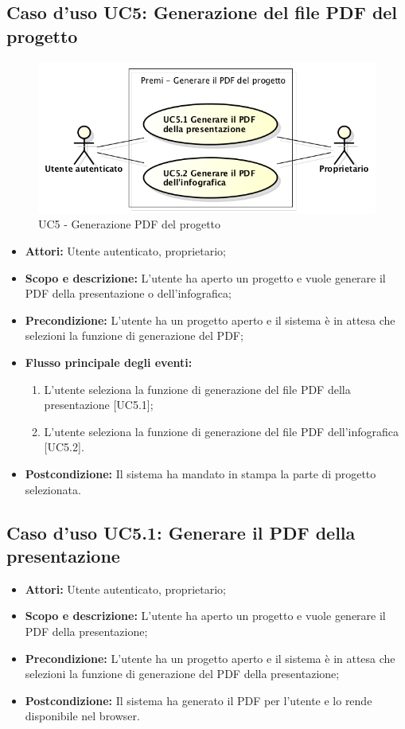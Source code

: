 \subsection{Caso d'uso UC5: Generazione del file PDF del progetto}
\begin{figure}[h] 
	\centering 
	\includegraphics[scale=0.45] {img/UC5.png}
	\caption{UC5 - Generazione PDF del progetto} 
\end{figure}

\begin{itemize}
	\item \textbf{Attori:} Utente autenticato, proprietario;
	\item \textbf{Scopo e descrizione:} L'utente ha aperto un progetto e vuole generare il PDF della presentazione o dell'\gls{infografica};
	\item \textbf{Precondizione:} L'utente ha un progetto aperto e il sistema è in attesa che selezioni la funzione di generazione del PDF;
	\item \textbf{Flusso principale degli eventi:}
	\begin{enumerate}
		\item L'utente seleziona la funzione di generazione del file PDF della presentazione [UC5.1];
		\item L'utente seleziona la funzione di generazione del file PDF dell'\gls{infografica} [UC5.2].
	\end{enumerate}
	\item \textbf{Postcondizione:} Il sistema ha mandato in stampa la parte di progetto selezionata.
\end{itemize}

	\subsection{Caso d'uso UC5.1: Generare il PDF della presentazione}
	\begin{itemize}
		\item \textbf{Attori:} Utente autenticato, proprietario;
		\item \textbf{Scopo e descrizione:} L'utente ha aperto un progetto e vuole generare il PDF della presentazione;
		\item \textbf{Precondizione:} L'utente ha un progetto aperto e il sistema è in attesa che selezioni la funzione di generazione del PDF della presentazione;
		\item \textbf{Postcondizione:} Il sistema ha generato il PDF per l'utente e lo rende disponibile nel \gls{browser}.
	\end{itemize}
	
